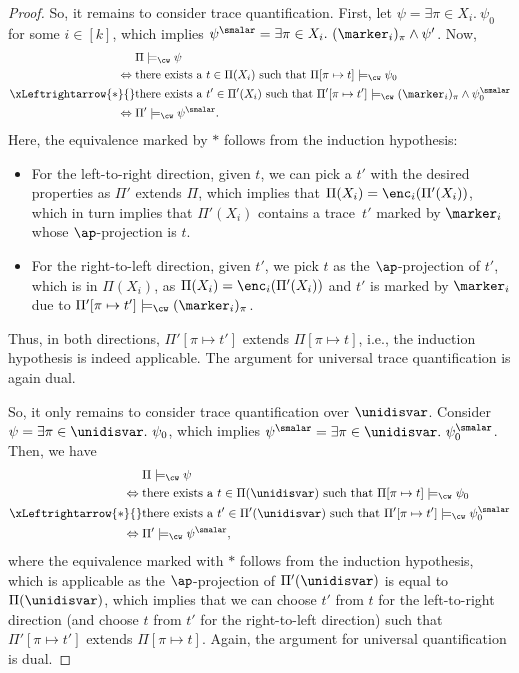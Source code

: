 \begin{proof}
So, it remains to consider trace quantification. 
First, let $\psi= \exists \pi \in X_i.\ \psi_0$ for some $i \in [k]$, which implies
$\psi^{\smalar} = \exists \pi \in X_i.\ (\marker_{i})_{\pi} \wedge \psi'$.
Now,
\begin{align*}
{}&{}\Pi \models_\cw \psi \\
\Leftrightarrow{}&{}
\text{there exists a $t \in \Pi(X_i)$ such that } \Pi[\pi \mapsto t] \models_\cw \psi_0 \\
\xLeftrightarrow{\ast}{}&{}
\text{there exists a $t' \in \Pi'(X_i)$ such that } \Pi'[\pi \mapsto t'] \models_\cw (\marker_{i})_\pi \wedge\psi_0^{\smalar} \\
\Leftrightarrow{}&{}
\Pi' \models_\cw  \psi^{\smalar}.
\end{align*}
Here, the equivalence marked by $\ast$ follows from the induction hypothesis: 
\begin{itemize}
    \item For the left-to-right direction, given $t$, we can pick a $t'$ with the desired properties as $\Pi'$ extends $\Pi$, which implies that $\Pi(X_i) = \enc_i(\Pi'(X_i))$, which in turn implies that $\Pi'(X_i)$ contains a trace~$t'$ marked by $\marker_{i}$ whose $\ap$-projection is $t$.
    \item For the right-to-left direction, given $t'$, we pick $t$ as the $\ap$-projection of $t'$, which is in $\Pi(X_i)$, as $\Pi(X_i) = \enc_i(\Pi'(X_i))$ and $t'$ is marked by $\marker_i$ due to $\Pi'[\pi \mapsto t']  \models_\cw (\marker_{i})_\pi$.
\end{itemize}
Thus, in both directions, $\Pi'[\pi \mapsto t']$ extends $\Pi[\pi \mapsto t] $, i.e., the induction hypothesis is indeed applicable.
The argument for universal trace quantification is again dual. 

So, it only remains to consider trace quantification over $\unidisvar$.
Consider $\psi = \exists \pi \in \unidisvar.\ \psi_0$, which implies $\psi^{\smalar} = \exists \pi \in \unidisvar.\ \psi_0^{\smalar}$.
Then, we have
\begin{align*}
{}&{}\Pi\models_\cw \psi \\
\Leftrightarrow{}&{} \text{there exists a $t \in \Pi(\unidisvar)$ such that $\Pi[\pi \mapsto t] \models_\cw \psi_0$} \\
\xLeftrightarrow{\ast}{}&{} \text{there exists a $t' \in \Pi'(\unidisvar)$ such that $\Pi'[\pi \mapsto t'] \models_\cw \psi_0^{\smalar}$}\\
\Leftrightarrow{}&{} \Pi'\models_\cw \psi^{\smalar}
,    
\end{align*}
where the equivalence marked with $\ast$ follows from the induction hypothesis, which is applicable as the $\ap$-projection of $\Pi'(\unidisvar)$ is equal to $\Pi(\unidisvar)$, which implies that we can choose $t'$ from 
$t$ for the left-to-right direction (and choose $t$ from 
$t'$ for the right-to-left direction) such that $\Pi'[\pi \mapsto t']$ extends $\Pi[\pi \mapsto t]$.
Again, the argument for universal quantification is dual.
\end{proof}

